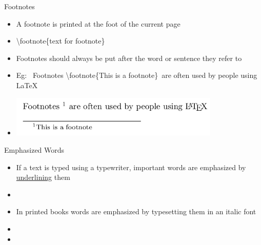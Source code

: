 \documentclass{beamer}
\begin{document}
\begin{frame}{Footnotes}
\begin{itemize}
\item A footnote is printed at the foot of the current page
\pause \item[] \textbackslash footnote\{text for footnote\}
\pause \item Footnotes should always be put after the word or sentence they refer to
\pause \item Eg:~ Footnotes \textbackslash footnote\{This is a footnote\}~are often used by people using \LaTeX \\
\item[] \includegraphics[width=10cm]{footnote}
\end{itemize}
\end{frame}

\begin{frame}{Emphasized Words}
\begin{itemize}
\pause \item If a text is typed using a typewriter, important words are emphasized by \underline{underlining} them
\pause \item[] 
\pause \item In printed books words are emphasized by typesetting them in an italic font
\pause \item[] 
\pause \item[] 
\end{itemize}
\end{frame}
\end{document}
